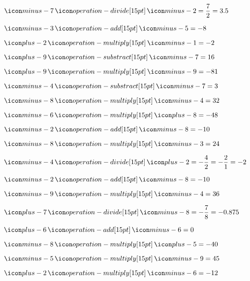 {{\item$\mseven \obelus \mtwo = \dfrac{7}{2} = 3.5$

\item$\mthree \plus \mfive = -8$

\item$\two \time \mone = -2$

\item$\nine \minus \mseven = 16$

\item$\nine \time \mnine = -81$

\item$\mfour \minus \mseven = 3$

\item$\meight \time \mfour = 32$

\item$\msix \time \eight = -48$

\item$\mtwo \plus \meight = -10$

\item$\meight \time \mthree = 24$

\item$\mfour \obelus \two = -\dfrac{4}{2} = -\dfrac{2}{1} = -2$

\item$\mtwo \plus \meight = -10$

\item$\mnine \time \mfour = 36$

\item$\seven \obelus \meight = -\dfrac{7}{8} = -0.875$

\item$\six \plus \msix = 0$

\item$\meight \time \five = -40$

\item$\mfive \time \mnine = 45$

\item$\two \time \msix = -12$

}}